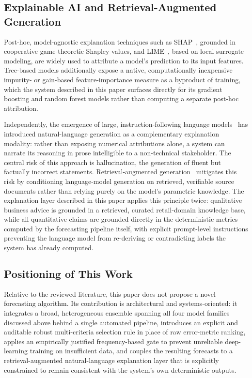 \subsection{Explainable AI and Retrieval-Augmented Generation}
Post-hoc, model-agnostic explanation techniques such as SHAP~\cite{lundberg2017shap}, grounded in cooperative game-theoretic Shapley values, and LIME~\cite{ribeiro2016lime}, based on local surrogate modeling, are widely used to attribute a model's prediction to its input features. Tree-based models additionally expose a native, computationally inexpensive impurity- or gain-based feature-importance measure as a byproduct of training, which the system described in this paper surfaces directly for its gradient boosting and random forest models rather than computing a separate post-hoc attribution.

Independently, the emergence of large, instruction-following language models~\cite{brown2020gpt3,devlin2019bert} has introduced natural-language generation as a complementary explanation modality: rather than exposing numerical attributions alone, a system can narrate its reasoning in prose intelligible to a non-technical stakeholder. The central risk of this approach is hallucination, the generation of fluent but factually incorrect statements. Retrieval-augmented generation~\cite{lewis2020rag} mitigates this risk by conditioning language-model generation on retrieved, verifiable source documents rather than relying purely on the model's parametric knowledge. The explanation layer described in this paper applies this principle twice: qualitative business advice is grounded in a retrieved, curated retail-domain knowledge base, while all quantitative claims are grounded directly in the deterministic metrics computed by the forecasting pipeline itself, with explicit prompt-level instructions preventing the language model from re-deriving or contradicting labels the system has already computed.

\subsection{Positioning of This Work}
Relative to the reviewed literature, this paper does not propose a novel forecasting algorithm. Its contribution is architectural and systems-oriented: it integrates a broad, heterogeneous ensemble spanning all four model families discussed above behind a single automated pipeline, introduces an explicit and auditable robust multi-criteria selection rule in place of raw error-metric ranking, applies an empirically justified frequency-based gate to prevent unreliable deep-learning training on insufficient data, and couples the resulting forecasts to a retrieval-augmented natural-language explanation layer that is explicitly constrained to remain consistent with the system's own deterministic outputs.

